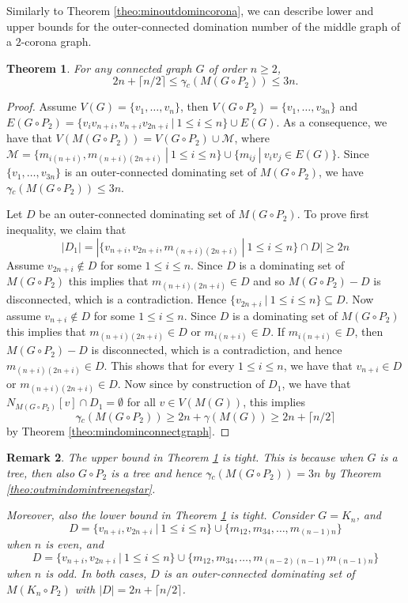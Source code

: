 \documentclass[a4paper,12pt, reqno]{amsart}
\newtheorem{Theorem}{Theorem}[section]
\newtheorem{Remark}[Theorem]{Remark}
\begin{document}
Similarly to Theorem \ref{theo:minoutdomincorona}, we can describe lower and upper bounds for the outer-connected domination number of the middle graph of a $2$-corona graph.
\begin{Theorem}\label{theominoutdomin2corona}
	For any connected graph $G$ of order $n\geq 2$, $$2n+\lceil n/2 \rceil \leq \gamma{\tilde{}} _{c}(M(G\circ P_2)) \leq 3n.$$
\end{Theorem}
\begin{proof} 
	Assume $V(G)=\{v_1,\dots, v_n\}$, then $V(G\circ P_2)= \{v_{1},\dots, v_{3n}\}$ and $E(G\circ P_2)=\{v_iv_{n+i}, v_{n+i}v_{2n+i}~|~1\leq i \leq n \}\cup E(G) $. As a consequence, we have that $V(M(G\circ P_2))=V(G\circ P_2)\cup \mathcal{M}$, where $\mathcal{M}=\{ m_{i(n+i)},m_{(n+i)(2n+i)}~|~1\leq i \leq n \}\cup \{ m_{ij}~|~v_iv_j\in  E(G)\}$. 
	Since $\{v_1,\dots, v_{3n}\}$ is an outer-connected dominating set of $M(G\circ P_2)$, we have $\gamma{\tilde{}} _{c}(M(G\circ P_2)) \leq 3n$.
	
	 Let $D$ be an outer-connected dominating set of $M(G\circ P_2)$. To prove first inequality, we claim that $$|D_1|=|\{v_{n+i},v_{2n+i},m_{(n+i)(2n+i)}~|~1\leq i \leq n \} \cap D | \ge 2n$$
	 Assume $v_{2n+i} \notin D$ for some $1 \le i \le n$. Since $D$ is a dominating set of $M(G\circ P_2)$ this implies that $m_{(n+i)(2n+i)} \in D$ and so $M(G\circ P_2)-D$ is disconnected, which is a contradiction. Hence $\{v_{2n+i}~|~1\leq i \leq n \} \subseteq D$. Now assume  $v_{n+i} \notin D$ for some $1 \le i \le n$. Since $D$ is a dominating set of $M(G\circ P_2)$ this implies that $m_{(n+i)(2n+i)} \in D$ or $m_{i(n+i)} \in D$. If $m_{i(n+i)} \in D$, then $M(G\circ P_2)-D$ is disconnected, which is a contradiction, and hence $m_{(n+i)(2n+i)}\in D$. This shows that for every $1 \le i \le n$, we have that $v_{n+i} \in D$ or $m_{(n+i)(2n+i)}\in D$.
	 Now since by construction of $D_1$, we have that $N_{M(G\circ P_2)}[v] \cap D_{1}=\emptyset$ for all $v \in V(M(G))$, this implies $$\gamma{\tilde{}} _{c}(M(G\circ P_2)) \geq 2n+\gamma(M(G)) \geq 2n+\lceil n/2 \rceil$$ by Theorem \ref{theo:mindominconnectgraph}.

\end{proof}
\begin{Remark}
	The upper bound in Theorem \ref{theominoutdomin2corona} is tight. This is because when $G$ is a tree, then also $G\circ P_2$ is a tree and hence $\gamma{\tilde{}} _{c}(M(G\circ P_2))=3n$ by Theorem \ref{theo:outmindomintreeneqstar}.

	Moreover, also the lower bound in Theorem \ref{theominoutdomin2corona} is tight. Consider $G=K_n$, and
	$$D=\{v_{n+i},v_{2n+i}~|~1 \leq i \leq n\} \cup \{m_{12}, m_{34}, \dots, m_{(n-1)n}\}$$	when $n$ is even, and 
	$$D=\{v_{n+i},v_{2n+i}~|~1 \leq i \leq n\} \cup \{m_{12}, m_{34}, \dots, m_{(n-2)(n-1)} m_{(n-1)n}\}$$	when $n$ is odd. In both cases, $D$ is an outer-connected dominating set of $M(K_n\circ P_2)$ with $|D|=2n+\lceil n/2 \rceil$.
\end{Remark}
\end{document}
